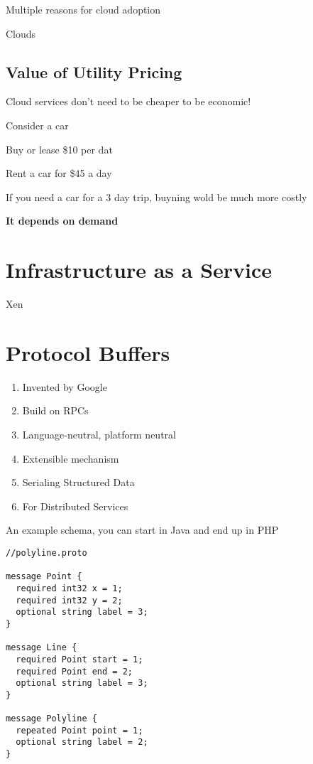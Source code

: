 Multiple reasons for cloud adoption

Clouds 


\section{Value of Utility Pricing}

Cloud services don't need to be cheaper to be economic!

Consider a car

Buy or lease \$10 per dat

Rent a car for \$45 a day

If you need a car for a 3 day trip, buyning wold be much more costly

\textbf{It depends on demand}


\chapter{Infrastructure as a Service}

Xen

\chapter{Protocol Buffers}

\begin{enumerate}
\item Invented by Google
\item Build on RPCs
\item Language-neutral, platform neutral
\item Extensible mechanism
\item Serialing Structured Data
\item For Distributed Services
\end{enumerate}

An example schema, you can start in Java and end up in PHP

\begin{verbatim}
//polyline.proto

message Point {
  required int32 x = 1;
  required int32 y = 2;
  optional string label = 3;
}

message Line {
  required Point start = 1;
  required Point end = 2;
  optional string label = 3;
}

message Polyline {
  repeated Point point = 1;
  optional string label = 2;
}
\end{verbatim}


